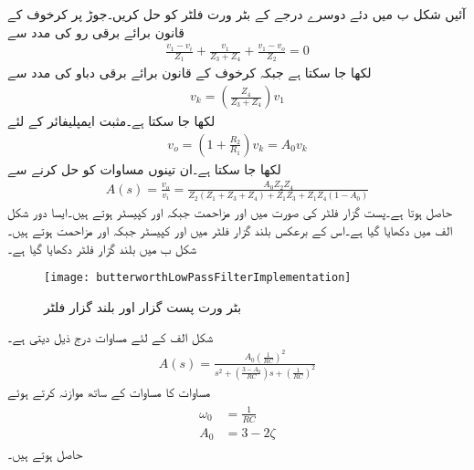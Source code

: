 آئیں شکل  ب میں دئے دوسرے درجے کے بٹر ورت فلٹر کو حل کریں۔جوڑ  پر کرخوف کے قانون برائے برقی رو کی مدد سے
\begin{align*}
\frac{v_1-v_i}{Z_1}+\frac{v_1}{Z_3+Z_4}+\frac{v_1-v_o}{Z_2}=0
\end{align*}
لکھا جا سکتا ہے جبکہ کرخوف کے قانون برائے برقی دباو کی مدد سے 
\begin{align*}
v_k= \left(\frac{Z_4}{Z_3+Z_4} \right) v_1
\end{align*}
لکھا جا سکتا ہے۔مثبت ایمپلیفائر کے لئے
\begin{align*}
v_o=\left(1+\frac{R_2}{R_1}\right) v_k=A_0 v_k
\end{align*}
لکھا جا سکتا ہے۔ان تینوں مساوات کو حل کرنے سے
\begin{align}\label{مساوات_تعددی_دو_درجی_بٹرورت_فلٹر_کی_افزائش}
A(s)=\frac{v_o}{v_i}=\frac{A_0 Z_2 Z_4}{Z_2 \left(Z_1+Z_3+Z_4 \right)+Z_1 Z_3+Z_1 Z_4 \left(1-A_0 \right)}
\end{align}
حاصل ہوتا ہے۔پست گزار فلٹر کی صورت میں  اور  مزاحمت جبکہ  اور  کپیسٹر ہوتے ہیں۔ایسا دور شکل  الف میں دکھایا گیا ہے۔اس کے برعکس بلند گزار فلٹر میں  اور  کپیسٹر جبکہ  اور  مزاحمت ہوتے ہیں۔شکل  ب میں بلند گزار فلٹر دکھایا گیا ہے۔  
\begin{figure}
\centering
\texttt{[image: butterworthLowPassFilterImplementation]}
\caption{بٹر ورت پست گزار اور بلند گزار فلٹر}
\label{شکل_تعددی_ردعمل_بٹر_ورت_فلٹر_پست_بلند_گزار}
\end{figure}

شکل  الف کے لئے مساوات  درج ذیل دیتی ہے۔
\begin{align}\label{مساوات_تعددی_دو_درجی_بٹرورت_پست_گزار_فلٹر_کی_افزائش}
A(s)=\frac{A_0 \left(\frac{1}{RC} \right)^2}{s^2+\left(\frac{3-A_0}{RC} \right) s+ \left(\frac{1}{RC} \right)^2}
\end{align}
مساوات  کا مساوات  کے ساتھ موازنہ  کرتے ہوئے
\begin{gather}
\begin{aligned}\label{مساوات_تعددی_ردعمل_بٹرورت_تخلیقی_مساوات}
\omega_0&=\frac{1}{RC}\\
A_0&=3-2 \zeta
\end{aligned}
\end{gather}
حاصل ہوتے ہیں۔

